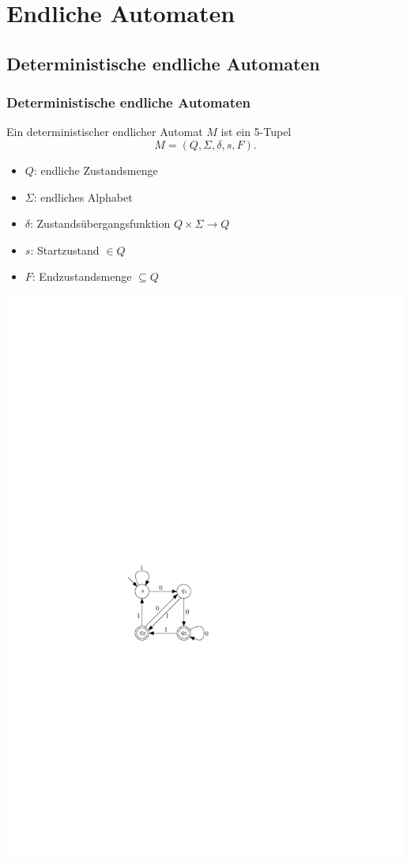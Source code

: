 \section{Endliche Automaten}
\subsection{Deterministische endliche Automaten}
\begin{frame}
\frametitle{Deterministische endliche Automaten}

	\begin{minipage}{0.5 \textwidth}
	 \raggedright{ Ein deterministischer endlicher Automat $M$ ist ein 5-Tupel 
        \[
        M= (Q,\Sigma,\delta,s,F).
        \] }
        \begin{itemize}
        \item $Q$:  endliche Zustandsmenge
        \item $\Sigma$:    endliches Alphabet
        \item $\delta$:   Zustandsübergangsfunktion $Q\times \Sigma \rightarrow Q$
        \item $s$:   Startzustand $\in Q$
        \item $F$:   Endzustandsmenge $\subseteq Q$
        \end{itemize}
	\end{minipage}
	\hfill
    \begin{minipage}{0.45 \textwidth}        
        \begin{center}
        	\includegraphics[scale=1]{images/beispielDEA1.pdf}

\end{center}
\end{minipage}
\end{frame}
